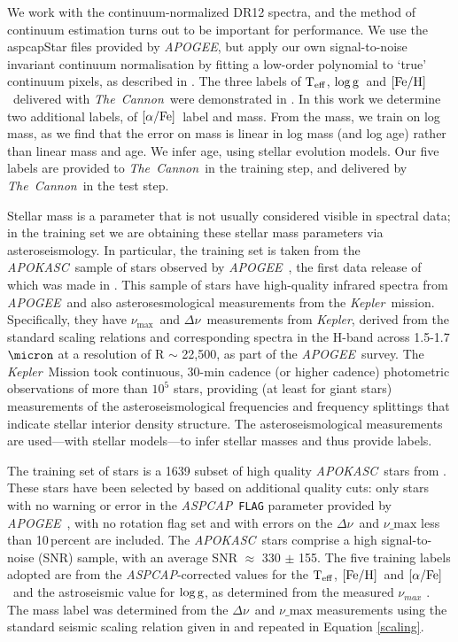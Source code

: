 \documentclass[12pt, preprint]{aastex}
\newcommand{\project}[1]{\textsl{#1}}
\newcommand{\tc}{\project{The~Cannon}}
\newcommand{\apogee}{\project{APOGEE}}
\newcommand{\apokasc}{\project{APOKASC}}
\newcommand{\aspcap}{\project{ASPCAP}}
\newcommand{\kepler}{\project{Kepler}}
\newcommand{\code}[1]{\texttt{#1}}
\newcommand{\teff}{\mbox{$\rm T_{eff}$}}
\newcommand{\feh}{\mbox{$\rm [Fe/H]$}}
\newcommand{\alphafe}{\mbox{$\rm [\alpha/Fe]$}}
\newcommand{\logg}{\mbox{$\rm \log g$}}
\newcommand{\numax}{$\nu_{\max}$}
\newcommand{\deltanu}{$\Delta\nu$}
\begin{document}
We work with the continuum-normalized DR12 spectra, and the method of continuum
estimation turns out to be important for performance. We use the aspcapStar files provided by \apogee, but apply our own signal-to-noise invariant continuum normalisation by fitting a low-order polynomial to `true' continuum pixels, as described in \citet{Ness2015}. 
The three labels of \teff, \logg\ and \feh\ delivered with \tc\ were demonstrated in \citet{Ness2015}.  In this work we determine two additional labels, of \alphafe\ label and mass. From the mass, we train on log mass, as we find that the error on mass is linear in log mass (and log age) rather than linear mass and age. We infer age, using stellar evolution models. Our five labels are provided to \tc\ in the training step, and delivered by \tc\ in the test step.

Stellar mass is a parameter that is not usually considered visible in
spectral data; in the training set we are obtaining these stellar mass
parameters via asteroseismology. In particular, the training set is taken from the \apokasc\ sample of
stars observed by \apogee\ \citep{Majewski2012}, the first data release of which was made in \citet{P2014}. 
This sample of stars have high-quality infrared
spectra from \apogee\ and also asterosesmological measurements from the \kepler\ mission.
Specifically, they have \numax\ and \deltanu\ measurements from \kepler, derived from the standard scaling relations \citep[see][and references therein]{P2014} and corresponding spectra in the H-band across 1.5-1.7 $\micron$ at a resolution of R $\sim$ 22,500, as part of the \apogee\ survey. 
The \kepler\ Mission \citep{B2010} took continuous, 30-min cadence (or
higher cadence) photometric observations of more than $10^5$ stars,
providing (at least for giant stars) measurements of the
asteroseismological frequencies and frequency splittings that indicate
stellar interior density structure.
The asteroseismological measurements are used---with stellar
models---to infer stellar masses and thus provide labels.

The training set of stars is a 1639 subset of high quality \apokasc\ stars from \citet{Martig2014}. These stars have been selected by \citet{Martig2014} based on additional quality cuts: only stars with no warning or error in the \aspcap\ \code{FLAG} parameter provided by \apogee\ \citep{Ahn2014}, with no rotation flag set and with errors on the  \deltanu\ and $\nu\_{\mbox{max}}$ less than 10\,percent are included. The \apokasc\ stars comprise a high signal-to-noise (SNR) sample, with an average SNR $\approx$ 330 $\pm$ 155. 
%
 The five training labels adopted are from the \aspcap-corrected \citep{Meszaros2013} values for the \teff, \feh\ and \alphafe\ and the astroseismic value for \logg, as determined from the measured $\nu_{max}$ . The mass label was determined from the  \deltanu\ and $\nu\_{\mbox{max}}$ measurements using the standard seismic scaling relation given in \citet{SilvaA2011,Chaplin2011} and repeated in Equation \ref{scaling}.
\end{document}
